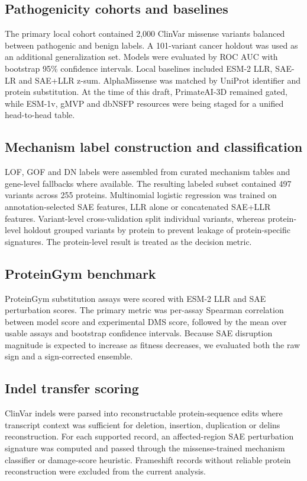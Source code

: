 \documentclass[pdflatex,sn-nature]{sn-jnl}
\begin{document}
\subsection{Pathogenicity cohorts and baselines}

The primary local cohort contained 2,000 ClinVar missense variants balanced between pathogenic and benign labels. A 101-variant cancer holdout was used as an additional generalization set. Models were evaluated by ROC AUC with bootstrap 95\% confidence intervals. Local baselines included ESM-2 LLR, SAE-LR and SAE+LLR z-sum. AlphaMissense was matched by UniProt identifier and protein substitution. At the time of this draft, PrimateAI-3D remained gated, while ESM-1v, gMVP and dbNSFP resources were being staged for a unified head-to-head table.

\subsection{Mechanism label construction and classification}

LOF, GOF and DN labels were assembled from curated mechanism tables and gene-level fallbacks where available. The resulting labeled subset contained 497 variants across 255 proteins. Multinomial logistic regression was trained on annotation-selected SAE features, LLR alone or concatenated SAE+LLR features. Variant-level cross-validation split individual variants, whereas protein-level holdout grouped variants by protein to prevent leakage of protein-specific signatures. The protein-level result is treated as the decision metric.

\subsection{ProteinGym benchmark}

ProteinGym substitution assays were scored with ESM-2 LLR and SAE perturbation scores. The primary metric was per-assay Spearman correlation between model score and experimental DMS score, followed by the mean over usable assays and bootstrap confidence intervals. Because SAE disruption magnitude is expected to increase as fitness decreases, we evaluated both the raw sign and a sign-corrected ensemble.

\subsection{Indel transfer scoring}

ClinVar indels were parsed into reconstructable protein-sequence edits where transcript context was sufficient for deletion, insertion, duplication or delins reconstruction. For each supported record, an affected-region SAE perturbation signature was computed and passed through the missense-trained mechanism classifier or damage-score heuristic. Frameshift records without reliable protein reconstruction were excluded from the current analysis.
\end{document}
